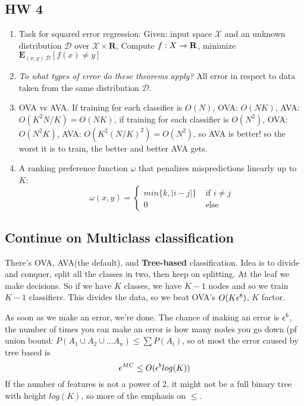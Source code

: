 \subsection{HW 4}
\label{sec:hw4}
\begin{enumerate}
\item Task for squared error regression: Given: input space $\mathcal{X}$
  and an unknown distribution $\mathcal{D}$ over $\mathcal{X}\times\mathbf{R}$, Compute $f:X\rightarrow
  \mathbf{R}$, minimize $\mathbf{E}_{(x,y)~\mathcal{D}}[f(x)\neq y]$
\item \emph{To what types of error do these theorems apply?} All error
  in respect to data taken from the same distribution $\mathcal{D}$.
\item OVA vs AVA. If training for each classifier is $O(N)$, OVA:
  $O(NK)$, AVA:$O(K^2N/K) = O(NK)$, if training for each classifier is
  $O(N^2)$, OVA: $O(N^2K)$, AVA: $O(K^2(N/K)^2)=O(N^2)$, so AVA is
  better! so the worst it is to train, the better and better AVA gets.
\item A ranking preference function $\omega$ that penalizes
  mispredictions linearly up to $K$: 
$$\omega(x,y) =
\begin{cases}
  min\{k, |i-j|\} & \text{ if $i\neq j$}\\
  0 & \text{ else}
\end{cases}$$
\end{enumerate}

\subsection{Continue on Multiclass classification}
\label{sec:multiclass}

There's OVA, AVA(the default), and \textbf{Tree-based}
classification. Idea is to divide and conquer, split all the classes
in two, then keep on splitting. At the leaf we make decisions. So if
we have $K$ classes, we have $K-1$ nodes and so we train $K-1$
classifiers. This divides the data, so we beat OVA's $O(K\epsilon^8)$, $K$
factor.

As soon as we make an error, we're done. The chance of making an error
is $\epsilon^b$, the number of times you can make an error is how many
nodes you go down (pf union bound: $P(A_1\cup A_2\cup \dots A_n) \le
\sum P(A_i)$, so at most the error caused by tree based is
$$\epsilon^{MC}\le O(\epsilon^blog(K))$$
If the number of features is not a power of 2, it might not be a full
binary tree with height $log(K)$, so more of the emphasis on $\le$.

